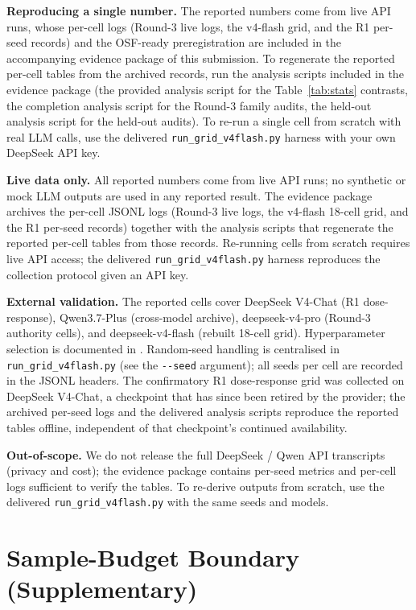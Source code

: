 \documentclass[11pt]{article}
\begin{document}
\noindent\textbf{Reproducing a single number.}
The reported numbers come from live API runs, whose per-cell logs (Round-3 live logs, the v4-flash grid, and the R1 per-seed records) and the OSF-ready preregistration are included in the accompanying evidence package of this submission. To regenerate the reported per-cell tables from the archived records, run the analysis scripts included in the evidence package (the provided analysis script for the Table~\ref{tab:stats} contrasts, the completion analysis script for the Round-3 family audits, the held-out analysis script for the held-out audits). To re-run a single cell from scratch with real LLM calls, use the delivered \texttt{run\_grid\_v4flash.py} harness with your own DeepSeek API key.

\noindent\textbf{Live data only.}
All reported numbers come from live API runs; no synthetic or mock LLM outputs are used in any reported result. The evidence package archives the per-cell JSONL logs (Round-3 live logs, the v4-flash 18-cell grid, and the R1 per-seed records) together with the analysis scripts that regenerate the reported per-cell tables from those records. Re-running cells from scratch requires live API access; the delivered \texttt{run\_grid\_v4flash.py} harness reproduces the collection protocol given an API key.

\noindent\textbf{External validation.}
The reported cells cover DeepSeek V4-Chat (R1 dose-response), Qwen3.7-Plus (cross-model archive), deepseek-v4-pro (Round-3 authority cells), and deepseek-v4-flash (rebuilt 18-cell grid). Hyperparameter selection is documented in . Random-seed handling is centralised in \texttt{run\_grid\_v4flash.py} (see the \texttt{-{}-seed} argument); all seeds per cell are recorded in the JSONL headers. The confirmatory R1 dose-response grid was collected on DeepSeek V4-Chat, a checkpoint that has since been retired by the provider; the archived per-seed logs and the delivered analysis scripts reproduce the reported tables offline, independent of that checkpoint's continued availability.

\noindent\textbf{Out-of-scope.}
We do not release the full DeepSeek / Qwen API transcripts (privacy and cost); the evidence package contains per-seed metrics and per-cell logs sufficient to verify the tables. To re-derive outputs from scratch, use the delivered \texttt{run\_grid\_v4flash.py} with the same seeds and models.


\appendix
\section{Sample-Budget Boundary (Supplementary)}
\label{sec:supp-sample-budget}
\end{document}

